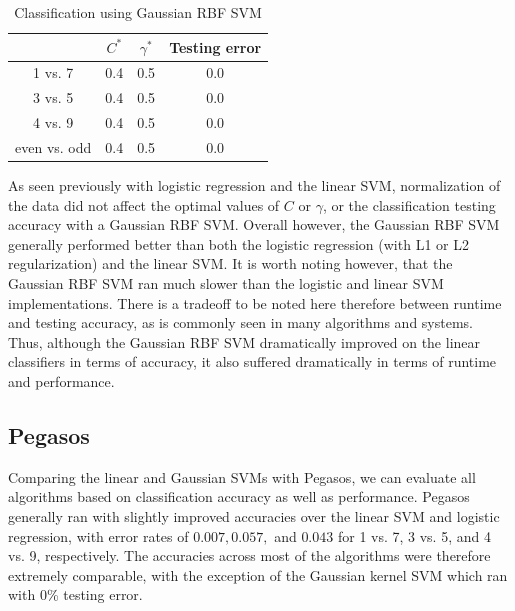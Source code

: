 \documentclass{article}
\begin{document}
\begin{table}
  \begin{center}
    \begin{tabular}{ | c | c | c | c | }
      \hline
                     & $C^*$          & $\gamma^*$           & Testing error      \\ \hline
      1 vs. 7        & 0.4            & 0.5                  & 0.0                \\ \hline
      3 vs. 5        & 0.4            & 0.5                  & 0.0                \\ \hline
      4 vs. 9        & 0.4            & 0.5                  & 0.0                \\ \hline
      even vs. odd   & 0.4            & 0.5                  & 0.0                \\ \hline
    \end{tabular}
  \end{center}
  \caption{Classification using Gaussian RBF SVM}
\end{table}

As seen previously with logistic regression and the linear SVM, normalization of the data did not affect the optimal values of $C$ or $\gamma$, or the classification testing accuracy with a Gaussian RBF SVM. Overall however, the Gaussian RBF SVM generally performed better than both the logistic regression (with L1 or L2 regularization) and the linear SVM. It is worth noting however, that the Gaussian RBF SVM ran much slower than the logistic and linear SVM implementations. There is a tradeoff to be noted here therefore between runtime and testing accuracy, as is commonly seen in many algorithms and systems. Thus, although the Gaussian RBF SVM dramatically improved on the linear classifiers in terms of accuracy, it also suffered dramatically in terms of runtime and performance.

\subsection{Pegasos}

Comparing the linear and Gaussian SVMs with Pegasos, we can evaluate all algorithms based on classification accuracy as well as performance. Pegasos generally ran with slightly improved accuracies over the linear SVM and logistic regression, with error rates of $0.007, 0.057,$ and $0.043$ for 1 vs. 7, 3 vs. 5, and 4 vs. 9, respectively. The accuracies across most of the algorithms were therefore extremely comparable, with the exception of the Gaussian kernel SVM which ran with 0\% testing error.
\end{document}
